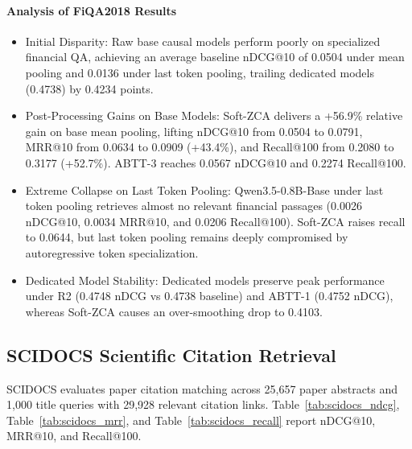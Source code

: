 \paragraph{Analysis of FiQA2018 Results}
\begin{itemize}
\item Initial Disparity: Raw base causal models perform poorly on specialized financial QA, achieving an average baseline nDCG@10 of 0.0504 under mean pooling and 0.0136 under last token pooling, trailing dedicated models (0.4738) by 0.4234 points.
\item Post-Processing Gains on Base Models: Soft-ZCA delivers a +56.9\% relative gain on base mean pooling, lifting nDCG@10 from 0.0504 to 0.0791, MRR@10 from 0.0634 to 0.0909 (+43.4\%), and Recall@100 from 0.2080 to 0.3177 (+52.7\%). ABTT-3 reaches 0.0567 nDCG@10 and 0.2274 Recall@100.
\item Extreme Collapse on Last Token Pooling: Qwen3.5-0.8B-Base under last token pooling retrieves almost no relevant financial passages (0.0026 nDCG@10, 0.0034 MRR@10, and 0.0206 Recall@100). Soft-ZCA raises recall to 0.0644, but last token pooling remains deeply compromised by autoregressive token specialization.
\item Dedicated Model Stability: Dedicated models preserve peak performance under R2 (0.4748 nDCG vs 0.4738 baseline) and ABTT-1 (0.4752 nDCG), whereas Soft-ZCA causes an over-smoothing drop to 0.4103.
\end{itemize}


\subsection{SCIDOCS Scientific Citation Retrieval}
SCIDOCS evaluates paper citation matching across 25,657 paper abstracts and 1,000 title queries with 29,928 relevant citation links. Table~\ref{tab:scidocs_ndcg}, Table~\ref{tab:scidocs_mrr}, and Table~\ref{tab:scidocs_recall} report nDCG@10, MRR@10, and Recall@100.






